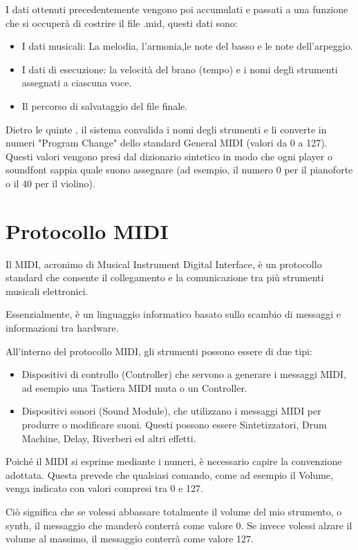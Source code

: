 I dati ottenuti precedentemente vengono poi accumulati e passati a una funzione che si occuperà di costrire il file .mid, questi dati sono:
\begin{itemize}
    \item I dati musicali: La melodia, l'armonia,le note del basso e le note dell'arpeggio.
    \item I dati di esecuzione: la velocità del brano (tempo) e i nomi degli strumenti assegnati a ciascuna voce.
    \item Il percorso di salvataggio del file finale.
\end{itemize}

Dietro le quinte , il sistema convalida i nomi degli strumenti e li converte in numeri "Program Change" dello standard General MIDI (valori da 0 a 127). Questi valori vengono presi dal dizionario sintetico in modo che ogni player o soundfont sappia quale suono assegnare (ad esempio, il numero 0 per il pianoforte o il 40 per il violino).


\section{Protocollo MIDI}
Il MIDI, acronimo di Musical Instrument Digital Interface, è un protocollo standard che consente il collegamento e la comunicazione tra più strumenti musicali elettronici.

Essenzialmente, è un linguaggio informatico basato sullo scambio di messaggi e informazioni tra hardware.

All’interno del protocollo MIDI, gli strumenti possono essere di due tipi:
\begin{itemize}
    \item Dispositivi di controllo (Controller) che servono a generare i messaggi MIDI, ad esempio una Tastiera MIDI muta o un Controller.
    \item Dispositivi sonori (Sound Module), che utilizzano i messaggi MIDI per produrre o modificare suoni. Questi possono essere Sintetizzatori, Drum Machine, Delay, Riverberi ed altri effetti.
\end{itemize}
Poiché il MIDI si esprime mediante i numeri, è necessario capire la convenzione adottata. Questa prevede che qualsiasi comando, come ad esempio il Volume, venga indicato con valori compresi tra 0 e 127.

Ciò significa che se volessi abbassare totalmente il volume del mio strumento, o synth, il messaggio che manderò conterrà come valore 0. Se invece volessi alzare il volume al massimo, il messaggio conterrà come valore 127. 

